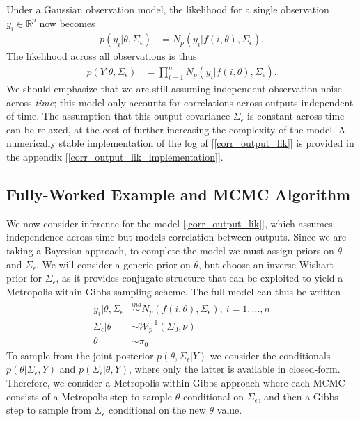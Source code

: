 \documentclass[12pt]{article}
\newcommand{\R}{\mathbb{R}}
\begin{document}
Under a Gaussian observation model, the likelihood for a single observation $y_i \in \R^p$ now becomes 
\begin{align}
p(y_i|\theta, \Sigma_\epsilon) &= N_p(y_i|f(i, \theta), \Sigma_\epsilon).
\end{align}
The likelihood across all observations is thus
\begin{align}
p(Y|\theta, \Sigma_\epsilon) &= \prod_{i = 1}^{n} N_p(y_i|f(i, \theta), \Sigma_\epsilon). \label{corr_output_lik}
\end{align}
We should emphasize that we are still assuming independent observation noise across \textit{time}; this model only accounts for correlations across outputs 
independent of time. The assumption that this output covariance $\Sigma_\epsilon$ is constant across time can be relaxed, at the cost of further increasing the 
complexity of the model. A numerically stable implementation of the log of [\ref{corr_output_lik}] is provided in the appendix [\ref{corr_output_lik_implementation}].

\subsection{Fully-Worked Example and MCMC Algorithm}
We now consider inference for the model [\ref{corr_output_lik}], which assumes independence across time but models correlation between outputs. Since we are taking a Bayesian approach, 
to complete the model we must assign priors on $\theta$ and $\Sigma_\epsilon$. We will consider a generic prior on $\theta$, but choose an inverse Wishart prior for $\Sigma_\epsilon$, as it
provides conjugate structure that can be exploited to yield a Metropolis-within-Gibbs sampling scheme. The full model can thus be written
\begin{align}
y_i|\theta, \Sigma_\epsilon &\overset{ind}{\sim} N_p(f(i, \theta), \Sigma_\epsilon), \ i = 1, \dots, n \\
\Sigma_\epsilon |\theta &\sim \mathcal{W}_p^{-1}(\Sigma_0, \nu) \nonumber \\
\theta &\sim \pi_0 \nonumber
\end{align}
To sample from the joint posterior $p(\theta, \Sigma_\epsilon|Y)$ we consider the conditionals $p(\theta|\Sigma_\epsilon, Y)$ and $p(\Sigma_\epsilon |\theta, Y)$, where only the latter is available 
in closed-form. Therefore, we consider a Metropolis-within-Gibbs approach where each MCMC consists of a Metropolis step to sample $\theta$ conditional on $\Sigma_\epsilon$, and then a Gibbs
step to sample from $\Sigma_\epsilon$ conditional on the new $\theta$ value. 
\end{document}
